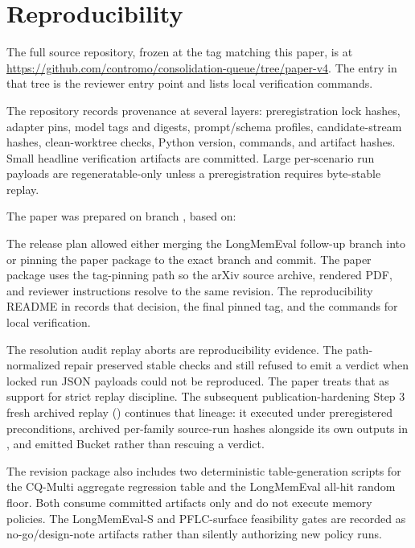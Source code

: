 \section{Reproducibility}
\label{app:reproducibility}

The full source repository, frozen at the tag matching this paper, is at
\url{https://github.com/contromo/consolidation-queue/tree/paper-v4}. The
 entry in that tree is the reviewer entry
point and lists local verification commands.

The repository records provenance at several layers: preregistration lock
hashes, adapter pins, model tags and digests, prompt/schema profiles,
candidate-stream hashes, clean-worktree checks, Python version, commands, and
artifact hashes. Small headline verification artifacts are committed. Large
per-scenario run payloads are regeneratable-only unless a preregistration
requires byte-stable replay.

The paper was prepared on branch , based on:
\begin{center}
\lmexternalbranch
\end{center}
The release plan allowed either merging the LongMemEval follow-up branch into
 or pinning the paper package to the exact branch and commit.
The paper package uses the tag-pinning path so the arXiv source archive,
rendered PDF, and reviewer instructions resolve to the same revision. The
reproducibility README in  records that
decision, the final pinned tag, and the commands for local verification.

The resolution audit replay aborts are reproducibility evidence. The
path-normalized repair
preserved stable checks and still refused to emit a verdict when locked run
JSON payloads could not be reproduced. The paper treats that as support for
strict replay discipline. The subsequent publication-hardening Step 3 fresh
archived replay ()
continues that lineage: it executed under preregistered preconditions,
archived per-family source-run hashes alongside its own outputs in
, and emitted
Bucket  rather than rescuing a verdict.

The revision package also includes two deterministic table-generation
scripts for the CQ-Multi aggregate regression table and the LongMemEval
all-hit random floor. Both consume committed artifacts only and do not execute
memory policies. The LongMemEval-S and PFLC-surface feasibility gates are
recorded as no-go/design-note artifacts rather than silently authorizing new
policy runs.
